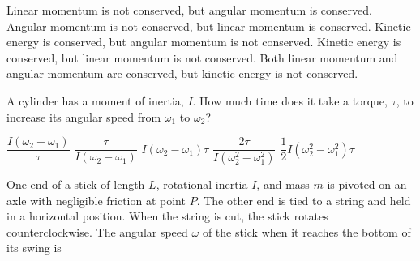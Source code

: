 \documentclass{../../../oss-ap12ibhl}
\begin{document}
\begin{questions}
  \begin{minipage}{.3\linewidth}
  \end{minipage}
  \begin{minipage}{.69\linewidth}
    \begin{choices}
      \choice Linear momentum is not conserved, but angular momentum is
      conserved.
      \choice Angular momentum is not conserved, but linear momentum is
      conserved.
      \choice Kinetic energy is conserved, but angular momentum is not
      conserved.
      \choice Kinetic energy is conserved, but linear momentum is not
      conserved.
      \choice Both linear momentum and angular momentum are conserved, but
      kinetic energy is not conserved.
    \end{choices}
  \end{minipage}
  \vspace{.7in}
    
  \question A cylinder has a moment of inertia, $I$. How much time does it take
  a torque, $\tau$, to increase its angular speed from $\omega_1$ to $\omega_2$?
  \begin{choices}
    \choice $\dfrac{I(\omega_2-\omega_1)}{\tau}$
    \choice $\dfrac{\tau}{I(\omega_2-\omega_1)}$
    \choice $I(\omega_2-\omega_1)\tau$
    \choice $\dfrac{2\tau}{I(\omega_2^2-\omega_1^2)}$
    \choice $\dfrac12I(\omega_2^2-\omega_1^2)\tau$
  \end{choices}
  \newpage
  
  \question One end of a stick of length $L$, rotational inertia $I$, and mass
  $m$ is pivoted on an axle with negligible friction at point $P$. The other end
  is tied to a string and held in a horizontal position. When the string is
  cut, the stick rotates counterclockwise. The angular speed $\omega$ of the
  stick when it reaches the bottom of its swing is


\end{questions}
\end{document}
